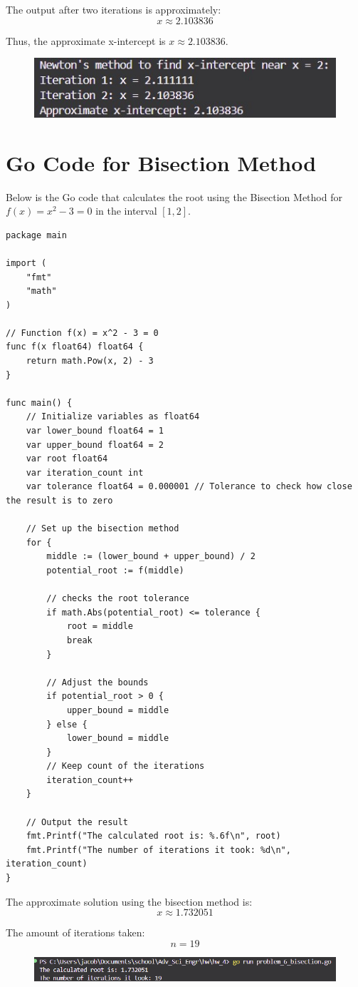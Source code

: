 \documentclass[11pt]{article}
\begin{document}
The output after two iterations is approximately:
\[
x \approx 2.103836
\]

Thus, the approximate x-intercept is \( x \approx 2.103836 \).

\begin{figure}[!ht]
    \centering
    \includegraphics[width= 1 \textwidth]{images/prob_5.jpg}
    \label{fig:1}
  \end{figure}
  \FloatBarrier

  \section{Go Code for Bisection Method}

Below is the Go code that calculates the root using the Bisection Method for \( f(x) = x^2 - 3 = 0 \) in the interval \( [1, 2] \).

\begin{verbatim}
package main

import (
	"fmt"
	"math"
)

// Function f(x) = x^2 - 3 = 0
func f(x float64) float64 {
	return math.Pow(x, 2) - 3
}

func main() {
	// Initialize variables as float64
	var lower_bound float64 = 1
	var upper_bound float64 = 2
	var root float64
	var iteration_count int
	var tolerance float64 = 0.000001 // Tolerance to check how close the result is to zero

	// Set up the bisection method
	for {
		middle := (lower_bound + upper_bound) / 2
		potential_root := f(middle)

		// checks the root tolerance
		if math.Abs(potential_root) <= tolerance {
			root = middle
			break
		}

		// Adjust the bounds
		if potential_root > 0 {
			upper_bound = middle
		} else {
			lower_bound = middle
		}
		// Keep count of the iterations
		iteration_count++
	}

	// Output the result
	fmt.Printf("The calculated root is: %.6f\n", root)
	fmt.Printf("The number of iterations it took: %d\n", iteration_count)
}
\end{verbatim}

  The approximate solution using the bisection method is:
\[
x \approx 1.732051
\]

The amount of iterations taken:
\[
n = 19
\]

  \begin{figure}[!ht]
    \centering
    \includegraphics[width= 1 \textwidth]{images/x_3.png}
    \label{fig:1}
  \end{figure}
  \FloatBarrier
\end{document}
